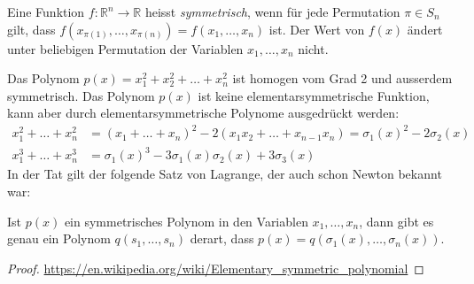 \begin{definition}
Eine Funktion $f\colon\mathbb{R}^n\to\mathbb{R}$ heisst {\em symmetrisch},
wenn für jede Permutation $\pi\in S_n$ gilt, dass
$f(x_{\pi(1)},\dots,x_{\pi(n)})=f(x_1,\dots,x_n)$
ist.
Der Wert von $f(x)$ ändert unter beliebigen Permutation der Variablen
$x_1,\dots,x_n$ nicht.
\end{definition}

Das Polynom $p(x)=x_1^2+x_2^2+\dots+x_n^2$ ist homogen vom Grad 2 und
ausserdem symmetrisch.
Das Polynom $p(x)$ ist keine elementarsymmetrische Funktion, kann
aber durch elementarsymmetrische Polynome ausgedrückt werden:
\begin{align*}
x_1^2 + \dots + x_n^2
&=
(x_1+\dots+x_n)^2 - 2(x_1x_2+\dots+x_{n-1}x_n)
=
\sigma_1(x)^2 -2 \sigma_2(x)
\\
x_1^3+\dots+x_n^3
&=
\sigma_1(x)^3
-3\sigma_1(x)\sigma_2(x)
+3\sigma_3(x)
\end{align*}
In der Tat gilt der folgende Satz von Lagrange, der auch schon
Newton bekannt war:

\begin{satz}[Lagrange]
Ist $p(x)$ ein symmetrisches Polynom in den Variablen $x_1,\dots,x_n$,
dann gibt es genau ein Polynom $q(s_1,\dots,s_n)$ derart, dass
$p(x)=q(\sigma_1(x),\dots,\sigma_n(x))$.
\end{satz}

\begin{proof}
\url{https://en.wikipedia.org/wiki/Elementary_symmetric_polynomial}
\end{proof}

